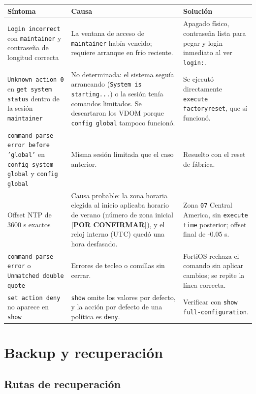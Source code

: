 \documentclass[11pt,a4paper]{article}
\newcommand{\pc}{\textcolor{warning}{\textbf{[POR CONFIRMAR]}}}
\begin{document}
{\footnotesize\noindent
\begin{tabularx}{\linewidth}{@{}P{3.2cm}YY@{}}
\toprule
{}\textbf{Síntoma} & \textbf{Causa} & \textbf{Solución}\\\midrule
\texttt{Login incorrect} con \texttt{maintainer} y contraseña de longitud correcta & La ventana de acceso de \texttt{maintainer} había vencido; requiere arranque en frío reciente. & Apagado físico, contraseña lista para pegar y login inmediato al ver \texttt{login:}. \\
\texttt{Unknown action 0} en \texttt{get system status} dentro de la sesión \texttt{maintainer} & No determinada: el sistema seguía arrancando (\texttt{System is starting...}) o la sesión tenía comandos limitados. Se descartaron los VDOM porque \texttt{config global} tampoco funcionó. & Se ejecutó directamente \texttt{execute factoryreset}, que sí funcionó. \\
\texttt{command parse error before 'global'} en \texttt{config system global} y \texttt{config global} & Misma sesión limitada que el caso anterior. & Resuelto con el reset de fábrica. \\
Offset NTP de 3600 s exactos & Causa probable: la zona horaria elegida al inicio aplicaba horario de verano (número de zona inicial \pc), y el reloj interno (UTC) quedó una hora desfasado. & Zona \texttt{07} Central America, sin \texttt{execute time} posterior; offset final de -0.05 s. \\
\texttt{command parse error} o \texttt{Unmatched double quote} & Errores de tecleo o comillas sin cerrar. & FortiOS rechaza el comando sin aplicar cambios; se repite la línea correcta. \\
\texttt{set action deny} no aparece en \texttt{show} & \texttt{show} omite los valores por defecto, y la acción por defecto de una política es \texttt{deny}. & Verificar con \texttt{show full-configuration}. \\
\bottomrule
\end{tabularx}\par}

\section{Backup y recuperación}

\subsection{Rutas de recuperación}
\end{document}
